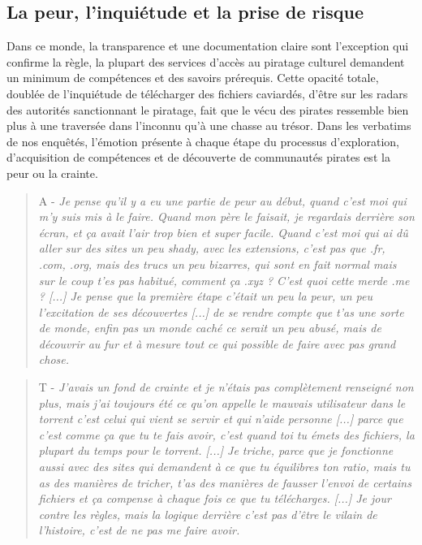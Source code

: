 \subsection*{La peur, l'inquiétude et la prise de risque}

Dans ce monde, la transparence et une documentation claire sont l'exception qui confirme la règle, la plupart des services d'accès au piratage culturel demandent un minimum de compétences et des savoirs prérequis. Cette opacité totale, doublée de l'inquiétude de télécharger des fichiers caviardés, d'être sur les radars des autorités sanctionnant le piratage, fait que le vécu des pirates ressemble bien plus à une traversée dans l'inconnu qu'à une chasse au trésor. Dans les verbatims de nos enquêtés, l'émotion présente à chaque étape du processus d'exploration, d'acquisition de compétences et de découverte de communautés pirates est la peur ou la crainte. 

\begin{quote}
    A - \textit{Je pense qu'il y a eu une partie de peur au début, quand c'est moi qui m'y suis mis à le faire. Quand mon père le faisait, je regardais derrière son écran, et ça avait l'air trop bien et super facile. Quand c'est moi qui ai dû aller sur des sites un peu shady, avec les extensions, c'est pas que .fr, .com, .org, mais des trucs un peu bizarres, qui sont en fait normal mais sur le coup t'es pas habitué, comment ça .xyz ? C'est quoi cette merde .me ? [...] Je pense que la première étape c'était un peu la peur, un peu l'excitation de ses découvertes [...] de se rendre compte que t'as une sorte de monde, enfin pas un monde caché ce serait un peu abusé, mais de découvrir au fur et à mesure tout ce qui possible de faire avec pas grand chose.}
\end{quote}

\begin{quote}
    T - \textit{ J'avais un fond de crainte et je n'étais pas complètement renseigné non plus, mais j'ai toujours été ce qu'on appelle le mauvais utilisateur dans le torrent c'est celui qui vient se servir et qui n'aide personne [...] parce que c'est comme ça que tu te fais avoir, c'est quand toi tu émets des fichiers, la plupart du temps pour le torrent. [...] Je triche, parce que je fonctionne aussi avec des sites qui demandent à ce que tu équilibres ton ratio, mais tu as des manières de tricher, t'as des manières de fausser l'envoi de certains fichiers et ça compense à chaque fois ce que tu télécharges. [...] Je jour contre les  règles, mais la logique derrière c'est pas d'être le vilain de l'histoire, c'est de ne pas me faire avoir.}
\end{quote}

